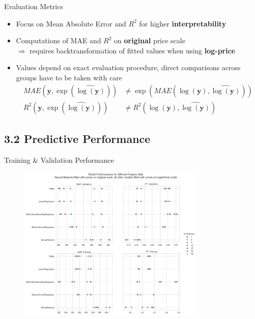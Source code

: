 \documentclass[ngerman,inputenc]{beamer}
\begin{document}
\begin{frame}{Evaluation Metrics}
  \begin{itemize}
    \item Focus on Mean Absolute Error and $R^2$ for higher \textbf{interpretability} \pause
    \item Computations of MAE and $R^2$ on \textbf{original} price scale  \\
          $\Rightarrow$ requires backtransformation of fitted values when using \textbf{log-price}\pause
    \item Values depend on exact evaluation procedure, direct comparisons across groups have to be taken with care
          \begin{align*}
            MAE \left(\mathbf{y}, \exp \left(\widehat{\log(\mathbf{y})}\right)\right)
             & \neq \exp \left(MAE \left(\log(\mathbf{y}), \widehat{\log(\mathbf{y})}\right) \right) \\
            R^2 \left(\mathbf{y}, \exp \left(\widehat{\log(\mathbf{y})}\right)\right)
             & \neq R^2 \left(\log(\mathbf{y}), \widehat{\log(\mathbf{y})}\right)
          \end{align*}
  \end{itemize}
\end{frame}

\subsection{3.2 Predictive Performance}

\begin{frame}{Training \& Validation Performance}
  \begin{figure}[h]
    \centering
    \includegraphics[width=0.8\textwidth]{model_comparison.png}
    \label{fig:model-comparison}
  \end{figure}
\end{frame}
\end{document}
